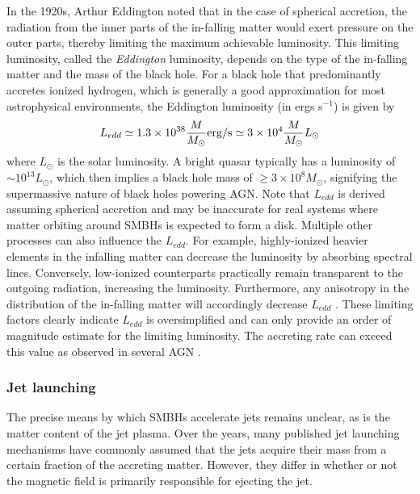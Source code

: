 In the 1920s, Arthur Eddington noted that in the case of spherical accretion, the radiation from the inner parts of the in-falling matter would exert pressure on the outer parts, thereby limiting the maximum achievable luminosity. This limiting luminosity, called the \textit{Eddington} luminosity,  depends on the type of the in-falling matter and the mass of the black hole. For a black hole that predominantly accretes ionized hydrogen, which is generally a good approximation for most astrophysical environments, the Eddington luminosity (in ergs s$^{-1}$) is given by
\begin{equation}
    L_{edd}\simeq1.3\times10^{38}\frac{M}{M_\odot}{\rm erg/
    s} 
    \simeq 3\times10^4\frac{M}{M_\odot}L_\odot
\end{equation}
where $L_\odot$ is the solar luminosity. A bright quasar typically has a luminosity of $\sim10^{13}L_\odot$, which then implies a black hole mass of  $\geq3\times10^8M_\odot$, signifying the supermassive nature of black holes powering AGN. Note that $L_{edd}$ is derived assuming spherical accretion and may be inaccurate for real systems where matter orbiting around SMBHs is expected to form a disk. Multiple other processes can also influence the $L_{edd}$. For example, highly-ionized heavier elements in the infalling matter can decrease the luminosity by absorbing spectral lines. Conversely, low-ionized counterparts practically remain transparent to the outgoing radiation, increasing the luminosity. Furthermore, any anisotropy in the distribution of the in-falling matter will accordingly decrease $L_{edd}$ \citep{frank2002accretion}. These limiting factors clearly indicate $L_{edd}$ is oversimplified and can only provide an order of magnitude estimate for the limiting luminosity. The accreting rate can exceed this value as observed in several AGN \citep[e.g.,][]{2014ApJ...793..108W,liu2021observational}. 
\subsubsection{Jet launching}
The precise means by which SMBHs accelerate jets remains unclear, as is the matter content of the jet plasma. Over the years, many published jet launching mechanisms have commonly assumed that the jets acquire their mass from a certain fraction of the accreting matter. However, they differ in whether or not the magnetic field is primarily responsible for ejecting the jet.


